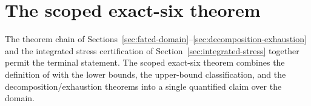 \section{The scoped exact-six theorem}\label{sec:scoped-exact-six}

%
%


The theorem chain of
Sections~\ref{sec:fatcd-domain}--\ref{sec:decomposition-exhaustion}
and the integrated stress certification of
Section~\ref{sec:integrated-stress} together permit the terminal
statement. The scoped exact-six theorem combines the definition of
\FATCD{} with the lower bounds, the upper-bound classification, and
the decomposition/exhaustion theorems into a single quantified claim
over the domain.

